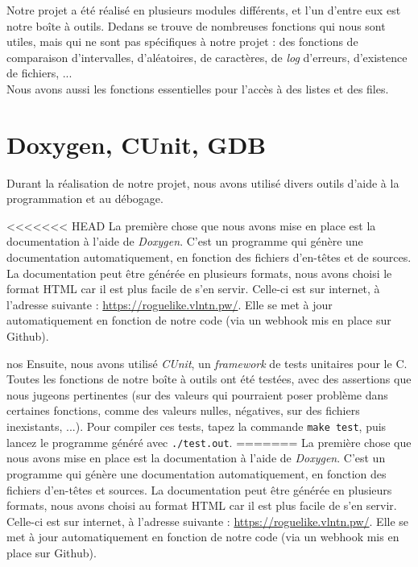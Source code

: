 \documentclass[11pt]{report}
\begin{document}
		Notre projet a été réalisé en plusieurs modules différents, et l'un d'entre eux est notre boîte à outils. Dedans se trouve de nombreuses fonctions qui nous sont utiles, mais qui ne sont pas spécifiques à notre projet : des fonctions de comparaison d'intervalles, d'aléatoires, de caractères, de \emph{log} d'erreurs, d'existence de fichiers, ...\\
		Nous avons aussi les fonctions essentielles pour l'accès à des listes et des files.

	\section{Doxygen, CUnit, GDB}\label{gdb}
	
		Durant la réalisation de notre projet, nous avons utilisé divers outils d'aide à la programmation et au débogage. 
		
		\vspace{12pt}		
		
<<<<<<< HEAD
		La première chose que nous avons mise en place est la documentation à l'aide de \emph{Doxygen}. C'est un programme qui génère une documentation automatiquement, en fonction des fichiers d'en-têtes et de sources. La documentation peut être générée en plusieurs formats, nous avons choisi le format HTML car il est plus facile de s'en servir. Celle-ci est sur internet, à l'adresse suivante : \url{https://roguelike.vlntn.pw/}. Elle se met à jour automatiquement en fonction de notre code (via un webhook mis en place sur Github).
		
		\vspace{12pt}
		nos
		Ensuite, nous avons utilisé \emph{CUnit}, un \emph{framework} de tests unitaires pour le C. Toutes les fonctions de notre boîte à outils ont été testées, avec des assertions que nous jugeons pertinentes (sur des valeurs qui pourraient poser problème dans certaines fonctions, comme des valeurs nulles, négatives, sur des fichiers inexistants, ...). Pour compiler ces tests, tapez la commande \texttt{make test}, puis lancez le programme généré avec \texttt{./test.out}.
=======
		La première chose que nous avons mise en place est la documentation à l'aide de \emph{Doxygen}. C'est un programme qui génère une documentation automatiquement, en fonction des fichiers d'en-têtes et sources. La documentation peut être générée en  plusieurs formats, nous avons choisi au format HTML car il est plus facile de s'en servir. Celle-ci est sur internet, à l'adresse suivante : \url{https://roguelike.vlntn.pw/}. Elle se met à jour automatiquement en fonction de notre code (via un webhook mis en place sur Github).
		
\end{document}

